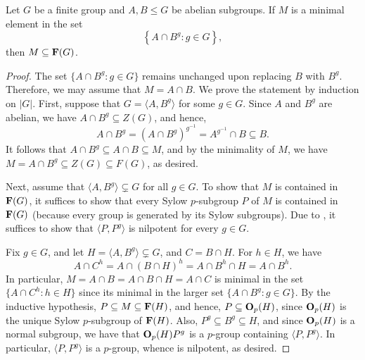 \begin{theorem}[Zenkov]
    Let $G$ be a finite group and $A, B\le G$ be abelian subgroups. If $M$ is a minimal element in the set 
    \begin{equation*}
        \left\{A\cap B^g\colon g\in G\right\},
    \end{equation*}
    then $M\subseteq\mathbf{F}(G)$.
\end{theorem}
\begin{proof}
    The set $\{A\cap B^g\colon g\in G\}$ remains unchanged upon replacing $B$ with $B^g$. Therefore, we may assume that $M = A\cap B$. We prove the statement by induction on $|G|$. First, suppose that $G = \langle A, B^g\rangle$ for some $g\in G$. Since $A$ and $B^g$ are abelian, we have $A\cap B^g\subseteq Z(G)$, and hence, 
    \begin{equation*}
        A\cap B^g = \left(A\cap B^g\right)^{g^{-1}} = A^{g^{-1}}\cap B\subseteq B.
    \end{equation*}
    It follows that $A\cap B^g\subseteq A\cap B\subseteq M$, and by the minimality of $M$, we have $M = A\cap B^g\subseteq Z(G)\subseteq F(G)$, as desired.

    Next, assume that $\langle A, B^g\rangle\subsetneq G$ for all $g\in G$. To show that $M$ is contained in $\mathbf{F}(G)$, it suffices to show that every Sylow $p$-subgroup $P$ of $M$ is contained in $\mathbf{F}(G)$ (because every group is generated by its Sylow subgroups). Due to , it suffices to show that $\langle P, P^g\rangle$ is nilpotent for every $g\in G$.

    Fix $g\in G$, and let $H = \langle A, B^g\rangle\subsetneq G$, and $C = B\cap H$. For $h\in H$, we have 
    \begin{equation*}
        A\cap C^h = A\cap\left(B\cap H\right)^h = A\cap B^h\cap H = A\cap B^h.
    \end{equation*}
    In particular, $M = A\cap B = A\cap B\cap H = A\cap C$ is minimal in the set $\{A\cap C^h\colon h\in H\}$ since its minimal in the larger set $\{A\cap B^g\colon g\in G\}$. By the inductive hypothesis, $P\subseteq M\subseteq\mathbf{F}(H)$, and hence, $P\subseteq\mathbf{O}_p(H)$, since $\mathbf{O}_p(H)$ is the unique Sylow $p$-subgroup of $\mathbf{F}(H)$. Also, $P^g\subseteq B^g\subseteq H$, and since $\mathbf{O}_p(H)$ is a normal subgroup, we have that $\mathbf{O}_p(H)P^g$ is a $p$-group containing $\langle P, P^g\rangle$. In particular, $\langle P, P^g\rangle$ is a $p$-group, whence is nilpotent, as desired.
\end{proof}

